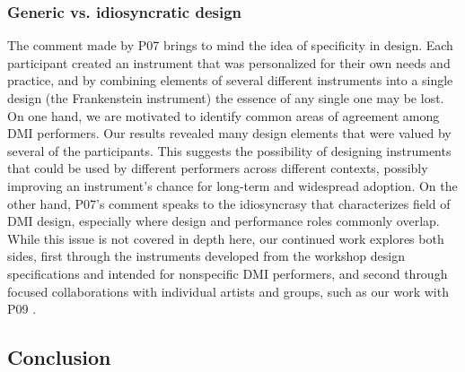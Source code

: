 \documentclass[letterpaper, 12pt]{article}
\begin{document}

\subsubsection{Generic vs. idiosyncratic design}
\label{sec:generic-vs-idiosyncratic-design}

The comment made by P07 brings to mind the idea of specificity in design. Each participant created an instrument that was personalized for their own needs and practice, and by combining elements of several different instruments into a single design (the Frankenstein instrument) the essence of any single one may be lost. On one hand, we are motivated to identify common areas of agreement among DMI performers. Our results revealed many design elements that were valued by several of the participants. This suggests the possibility of designing instruments that could be used by different performers across different contexts, possibly improving an instrument's chance for long-term and widespread adoption. On the other hand, P07's comment speaks to the idiosyncrasy that characterizes field of DMI design, especially where design and performance roles commonly overlap. While this issue is not covered in depth here, our continued work explores both sides, first through the instruments developed from the workshop design specifications and intended for nonspecific DMI performers, and second through focused collaborations with individual artists and groups, such as our work with P09 \citep{Sullivan2018}.

\subsection{Conclusion}
\label{sec:conclusion}
\end{document}
